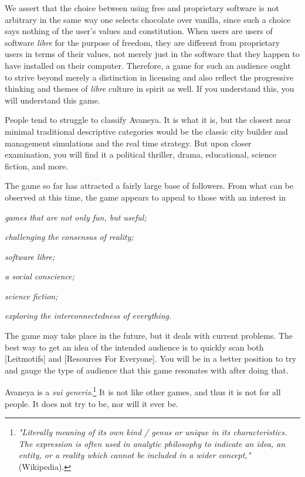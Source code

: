 We assert that the choice between using free and proprietary software is not arbitrary in the same way one selects chocolate over vanilla, since such a choice says nothing of the user's values and constitution. When users are users of software {\it libre} for the purpose of freedom, they are different from proprietary users in terms of their values, not merely just in the software that they happen to have installed on their computer. Therefore, a game for such an audience ought to strive beyond merely a distinction in licensing and also reflect the progressive thinking and themes of {\it libre} culture in spirit as well. If you understand this, you will understand this game.

People tend to struggle to classify Avaneya. It is what it is, but the closest near minimal traditional descriptive categories would be the classic city builder and management simulations and the real time strategy. But upon closer examination, you will find it a political thriller, drama, educational, science fiction, and more.

The game so far has attracted a fairly large base of followers. From what can be observed at this time, the game appears to appeal to those with an interest in

\startitemize[4]
\item
{\it games that are not only fun, but useful;}
\item
{\it challenging the consensus of reality;}
\item
{\it software libre;}
\item
{\it a social conscience;}
\item
{\it science fiction;}
\item
{\it exploring the interconnectedness of everything.}
\stopitemize

The game may take place in the future, but it deals with current problems. The best way to get an idea of the intended audience is to quickly scan both [Leitmotifs] and [Resources For Everyone]. You will be in a better position to try and gauge the type of audience that this game resonates with after doing that. 

Avaneya is a {\it sui generis}.\footnote{{\it "Literally meaning of its own kind / genus or unique in its characteristics. The expression is often used in analytic philosophy to indicate an idea, an entity, or a reality which cannot be included in a wider concept,"} (Wikipedia).} It is not like other games, and thus it is not for all people. It does not try to be, nor will it ever be.

